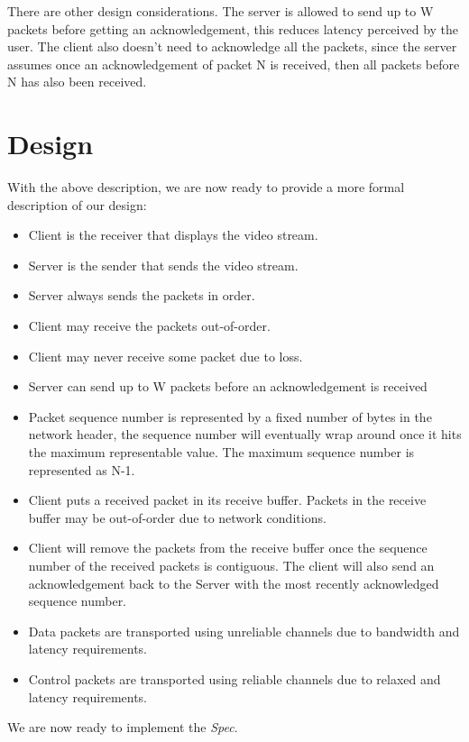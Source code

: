 There are other design considerations. The server is allowed to send up to W
packets before getting an acknowledgement, this reduces latency perceived by the
user. The client also doesn't need to acknowledge all the packets, since
the server assumes once an acknowledgement of packet N is received, then all packets
before N has also been received.

\section{Design}

With the above description, we are now ready to provide a more formal
description of our design:

\begin{itemize}
    \item Client is the receiver that displays the video stream.
    \item Server is the sender that sends the video stream.
    \item Server always sends the packets in order.
    \item Client may receive the packets out-of-order.
    \item Client may never receive some packet due to loss.
    \item Server can send up to W packets before an acknowledgement is received
    \item Packet sequence number is represented by a fixed number of bytes in
    the network header, the sequence number will eventually wrap around once it
    hits the maximum representable value. The maximum sequence number is
    represented as N-1. 
    \item Client puts a received packet in its receive buffer. Packets in the 
    receive buffer may be out-of-order due to network conditions.
    \item Client will remove the packets from the receive buffer once the
    sequence number of the received packets is contiguous. The client will also
    send an acknowledgement back to the Server with the most recently
    acknowledged sequence number.
    \item Data packets are transported using unreliable channels due to
    bandwidth and latency requirements.
    \item Control packets are transported using reliable channels due to relaxed 
    and latency requirements. 
\end{itemize}

We are now ready to implement the \textit{Spec}. 

